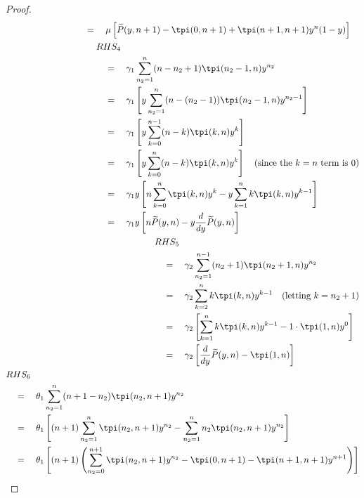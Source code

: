 \begin{proof}
\begin{align}
\begin{split}
            & \quad = \quad \mu \left[ \widetilde{P}(y,n+1) - \tpi(0,n+1) + \tpi(n+1,n+1) y^n (1-y) \right]
        \end{split} \\
        \begin{split}
            & RHS_4 \\
            & \quad = \quad \gamma_1 \sum_{n_2=1}^{n} (n-n_2+1) \tpi(n_2-1,n) y^{n_2} \\
            & \quad = \quad \gamma_1 \left[ y \sum_{n_2=1}^{n} (n - (n_2-1)) \tpi(n_2-1,n) y^{n_2-1} \right] \\
            & \quad = \quad \gamma_1 \left[ y \sum_{k=0}^{n-1} (n-k) \tpi(k,n) y^k \right] \\
            & \quad = \quad \gamma_1 \left[ y \sum_{k=0}^{n} (n-k) \tpi(k,n) y^k \right] \quad \text{(since the $k=n$ term is 0)} \\
            & \quad = \quad \gamma_1 y \left[ n \sum_{k=0}^{n} \tpi(k,n) y^k - y \sum_{k=1}^{n} k \tpi(k,n) y^{k-1} \right] \\
            & \quad = \quad \gamma_1 y \left[ n \widetilde{P}(y,n) - y \frac{d}{dy} \widetilde{P}(y,n) \right]
        \end{split} \\
        \begin{split}
            & RHS_5 \\
            & \quad = \quad \gamma_2 \sum_{n_2=1}^{n-1} (n_2+1) \tpi(n_2+1,n) y^{n_2} \\
            & \quad = \quad \gamma_2 \sum_{k=2}^{n} k \tpi(k,n) y^{k-1} \quad \text{(letting $k = n_2+1$)} \\
            & \quad = \quad \gamma_2 \left[ \sum_{k=1}^{n} k \tpi(k,n) y^{k-1} - 1 \cdot \tpi(1,n) y^0 \right] \\
            & \quad = \quad \gamma_2 \left[ \frac{d}{dy} \widetilde{P}(y,n) - \tpi(1,n) \right]
        \end{split} \\
        \begin{split}
            & RHS_6 \\
            & \quad = \quad \theta_1 \sum_{n_2=1}^{n} (n+1-n_2) \tpi(n_2,n+1) y^{n_2} \\
            & \quad = \quad \theta_1 \left[ (n+1) \sum_{n_2=1}^{n} \tpi(n_2,n+1) y^{n_2} - \sum_{n_2=1}^{n} n_2 \tpi(n_2,n+1) y^{n_2} \right] \\
            & \quad = \quad \theta_1 \left[ (n+1) \left( \sum_{n_2=0}^{n+1} \tpi(n_2,n+1) y^{n_2} - \tpi(0,n+1) - \tpi(n+1,n+1) y^{n+1} \right) \right] \\

\end{split}
\end{align}
\end{proof}
